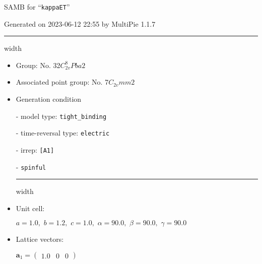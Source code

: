 \documentclass[fleqn,10pt,landscape]{article}
\begin{document}
\setcounter{MaxMatrixCols}{16}

\setlength{\baselineskip}{16pt}
\footnotesize
\begin{center}
\LARGE
SAMB for ``\texttt{kappaET}''
\end{center}
\begin{flushright}
Generated on 2023-06-12 22:55 by MultiPie 1.1.7
\end{flushright}
\vspace{1cm}


 \hfil \hrule height 1mm width \textwidth \hfil

\begin{itemize}
\item Group: No. 32\quad$C_{2v}^{8}$\quad$Pba2$\quad[ orthorhombic ]

\item Associated point group: No. 7\quad$C_{2v}$\quad$mm2$\quad[ orthorhombic ]

\vspace{5mm}

\item Generation condition

\quad - model type: \texttt{tight_binding}

\quad - time-reversal type: \texttt{electric}

\quad - irrep: \texttt{[A1]}

\quad - \texttt{spinful}


 \hfil \hrule height 1mm width \textwidth \hfil

\item Unit cell:

\quad $a=1.0,\,\, b=1.2,\,\, c=1.0,\,\, \alpha=90.0,\,\, \beta=90.0,\,\, \gamma=90.0$

\item Lattice vectors:

\quad $\bm{a}_1=\begin{pmatrix} 1.0 & 0 & 0 \end{pmatrix}$


\end{itemize}
\end{document}
